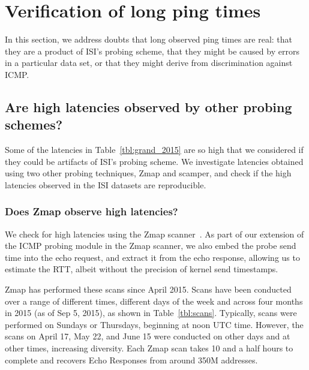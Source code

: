 \section{Verification of long ping times}
\label{sec:verification}

In this section, we address doubts that long observed ping
times are real: that they are a product of ISI's probing scheme, that
they might be caused by errors in a particular data set, or that they might derive from
discrimination against ICMP.

\subsection{Are high latencies observed by other probing schemes?}

Some of the latencies in Table~\ref{tbl:grand_2015} are so high that
we considered if they could be artifacts of ISI's probing scheme. We
investigate latencies obtained using two other probing techniques,
Zmap and scamper, and check if the high latencies observed in the ISI datasets are reproducible.



\subsubsection*{Does Zmap observe high latencies?}

We check for high latencies using the Zmap scanner~\cite{durumeric2013zmap}. 
%
As part of our extension of the ICMP probing module in the
Zmap scanner, we also embed the probe send time into the echo request,
and extract it from the
echo response, allowing us to estimate the RTT, albeit without the
precision of kernel send timestamps.
%

Zmap has performed these scans since April 2015. Scans have been conducted over a range of different times,
different days of the week and across four months in 2015 (as of Sep
5, 2015), as shown in Table~\ref{tbl:scans}. Typically, scans were performed on Sundays or Thursdays, beginning
at noon UTC time. However, the scans on April 17, May 22, and June 15
were conducted on other days and at other times, increasing diversity. Each Zmap scan
takes 10 and a half hours to complete and recovers Echo Responses from
around 350M addresses.
%

